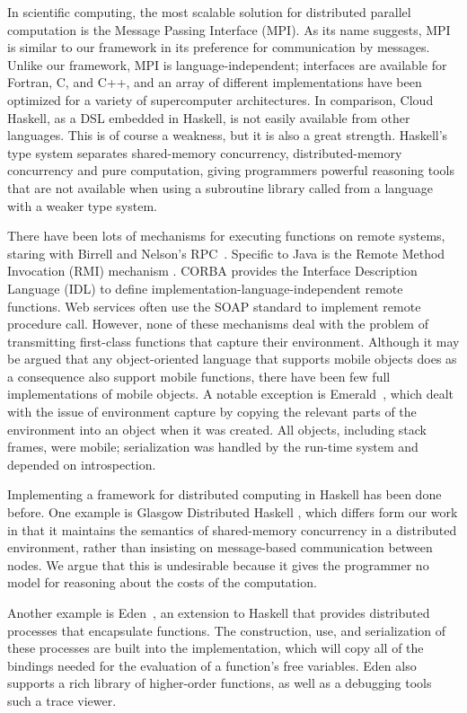 \documentclass{sigplanconf}
\begin{document}
In scientific computing, the most scalable solution for distributed parallel computation is the Message Passing Interface (MPI). As its name suggests, MPI is similar to our framework in its preference for communication by messages. Unlike our framework, MPI is language-independent; interfaces are available for Fortran, C, and C++, and an array of different implementations have been optimized for a variety of supercomputer architectures.  In comparison, Cloud Haskell, as a DSL embedded in Haskell, is not easily available from other languages.
This is of course a weakness, but it is also a great strength.  
Haskell's type system separates shared-memory concurrency, distributed-memory concurrency and pure computation, giving programmers powerful reasoning tools that are not available when using a subroutine library called from a language with a weaker type system. 

There have been lots of mechanisms for executing functions on remote
systems, staring with Birrell and Nelson's RPC~\cite{birrel1984}.
Specific to Java is the Remote Method Invocation (RMI) mechanism
\cite{javarmi}. CORBA provides the Interface Description Language (IDL)
\cite{corbaidl} to define implementation-language-independent remote
functions. Web services often use the SOAP standard to implement
remote procedure call.  However, none of these mechanisms deal with the problem of transmitting first-class functions that capture their environment.
Although it may be argued that any object-oriented language that supports mobile objects does as a consequence also support mobile functions, there have been few full implementations of mobile objects.  A notable exception is Emerald~\cite{jul1988}, which dealt with the issue of environment capture  by copying the relevant parts of the environment into an object when it was created.  
All objects, including stack frames, were mobile; serialization was handled by the run-time system and depended on introspection.

Implementing a framework for distributed computing in Haskell has been
done before. One example is Glasgow Distributed Haskell
\cite{gdh2001}, which differs form our work in that it maintains the semantics of
shared-memory concurrency in a distributed environment, rather than
insisting on message-based communication between nodes. We argue that this is 
undesirable because it gives the programmer no model for reasoning about the costs of the computation.  

Another example is Eden~\cite{Loogen2005}, an extension to Haskell that provides distributed processes that encapsulate functions.  The construction, use, and serialization of these processes are built into the implementation, which will copy all of the bindings needed for the evaluation of a function's free variables. Eden also supports a rich library of higher-order functions, as well as a debugging tools such a trace viewer.
\end{document}
